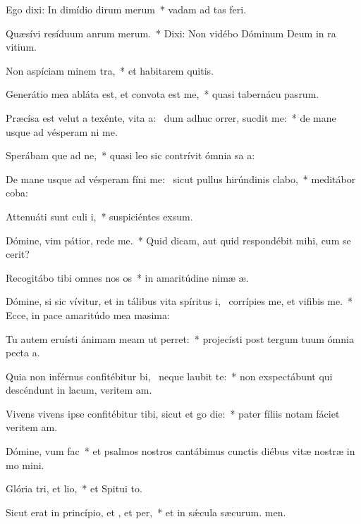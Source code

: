 \item Ego dixi: In dimídio dirum merum~* vadam ad tas feri.
\item Quæsívi resíduum anrum merum.~* Dixi: Non vidébo Dóminum Deum in ra vitium.
\item Non aspíciam minem tra,~* et habitarem quitis.
\item Generátio mea abláta est, et convota est  me,~* quasi tabernácu pasrum.
\item Præcísa est velut a texénte, vita a:~\pscross{} dum adhuc orrer, sucdit me:~* de mane usque ad vésperam ni me.
\item Sperábam que ad ne,~* quasi leo sic contrívit ómnia sa a:
\item De mane usque ad vésperam fíni me:~\pscross{} sicut pullus hirúndinis  clabo,~* meditábor  coba:
\item Attenuáti sunt culi i,~* suspiciéntes  exsum.
\item Dómine, vim pátior, rede  me.~* Quid dicam, aut quid respondébit mihi, cum se cerit?
\item Recogitábo tibi omnes nos os~* in amaritúdine nimæ æ.
\item Dómine, si sic vívitur, et in tálibus vita spíritus i,~\pscross{} corrípies me, et vifibis me.~* Ecce, in pace amaritúdo mea masima:
\item Tu autem eruísti ánimam meam ut  perret:~* projecísti post tergum tuum ómnia pecta a.
\item Quia non inférnus confitébitur bi,~\pscross{} neque  laubit te:~* non exspectábunt qui descéndunt in lacum, veritem am.
\item Vivens vivens ipse confitébitur tibi, sicut et go die:~* pater fíliis notam fáciet veritem am.
\item Dómine, vum  fac~* et psalmos nostros cantábimus cunctis diébus vitæ nostræ in mo mini.
\item Glória tri, et lio,~* et Spitui to.
\item Sicut erat in princípio, et , et per,~* et in sǽcula sæcurum. men.
